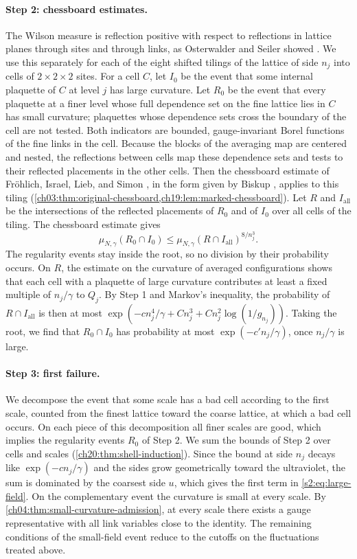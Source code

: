 \paragraph{Step 2: chessboard estimates.}
The Wilson measure is reflection positive with respect to reflections in lattice planes through sites and through links, as Osterwalder and Seiler showed \cite{OsterwalderSeiler1978}. We use this separately for each of the eight shifted tilings of the lattice of side $n_j$ into cells of $2\times2\times2$ sites. For a cell $C$, let $I_0$ be the event that some internal plaquette of $C$ at level $j$ has large curvature. Let $R_0$ be the event that every plaquette at a finer level whose full dependence set on the fine lattice lies in $C$ has small curvature; plaquettes whose dependence sets cross the boundary of the cell are not tested. Both indicators are bounded, gauge-invariant Borel functions of the fine links in the cell. Because the blocks of the averaging map are centered and nested, the reflections between cells map these dependence sets and tests to their reflected placements in the other cells. Then the chessboard estimate of Fr\"ohlich, Israel, Lieb, and Simon \cite{FILS1978,FILS1980}, in the form given by Biskup \cite{Biskup2009}, applies to this tiling (\cref{ch03:thm:original-chessboard,ch19:lem:marked-chessboard}). Let $R$ and $I_{\mathrm{all}}$ be the intersections of the reflected placements of $R_0$ and of $I_0$ over all cells of the tiling. The chessboard estimate gives
\[
 \mu_{N,\gamma}(R_0\cap I_0)\le\mu_{N,\gamma}(R\cap I_{\mathrm{all}})^{8/n_j^3}.
\]
The regularity events stay inside the root, so no division by their probability occurs. On $R$, the estimate on the curvature of averaged configurations shows that each cell with a plaquette of large curvature contributes at least a fixed multiple of $n_j/\gamma$ to $Q_j$. By Step 1 and Markov's inequality, the probability of $R\cap I_{\mathrm{all}}$ is then at most $\exp(-cn_j^4/\gamma+Cn_j^3+Cn_j^2\log(1/g_{n_j}))$. Taking the root, we find that $R_0\cap I_0$ has probability at most $\exp(-c'n_j/\gamma)$, once $n_j/\gamma$ is large.

\paragraph{Step 3: first failure.}
We decompose the event that some scale has a bad cell according to the first scale, counted from the finest lattice toward the coarse lattice, at which a bad cell occurs. On each piece of this decomposition all finer scales are good, which implies the regularity events $R_0$ of Step 2. We sum the bounds of Step 2 over cells and scales (\cref{ch20:thm:shell-induction}). Since the bound at side $n_j$ decays like $\exp(-cn_j/\gamma)$ and the sides grow geometrically toward the ultraviolet, the sum is dominated by the coarsest side $u$, which gives the first term in \eqref{s2:eq:large-field}. On the complementary event the curvature is small at every scale. By \cref{ch04:thm:small-curvature-admission}, at every scale there exists a gauge representative with all link variables close to the identity. The remaining conditions of the small-field event reduce to the cutoffs on the fluctuations treated above.

